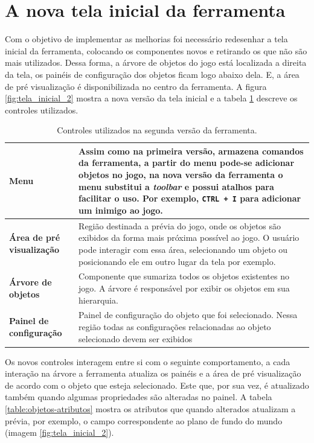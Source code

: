 \documentclass[12pt,twoside,openright,a4paper,english,brazil,sumario=tradicional]{abntex2}
\begin{document}
\section{A nova tela inicial da ferramenta}
Com o objetivo de implementar as melhorias foi necessário redesenhar a tela inicial da ferramenta, colocando os componentes novos e retirando os que não são mais utilizados. Dessa forma, a árvore de objetos do jogo está localizada a direita da tela, os painéis de configuração dos objetos ficam logo abaixo dela. E, a área de pré visualização é disponibilizada no centro da ferramenta.  A figura \ref{fig:tela_inicial_2} mostra a nova versão da tela inicial e a tabela \ref{table:ferramenta_areas_2} descreve os controles utilizados.

\begin{table}[h]
   \centering
   \begin{tabular}{| l | p{8cm} |}
      \hline
      \textbf{Menu} & Assim como na primeira versão, armazena comandos da ferramenta, a partir do menu pode-se adicionar objetos no jogo, na nova versão da ferramenta o menu substitui a \emph{toolbar} e possui atalhos para facilitar o uso. Por exemplo, \texttt{CTRL + I} para adicionar um inimigo ao jogo. \\
      \hline
      \textbf{Área de pré visualização} & Região  destinada a prévia do jogo, onde os objetos são exibidos da forma mais próxima possível ao jogo. O usuário pode interagir com essa área, selecionando um objeto ou posicionando ele em outro lugar da tela por exemplo.\\
      \hline
      \textbf{Árvore de objetos} & Componente que sumariza todos os objetos existentes no jogo. A árvore é responsável por exibir os objetos em sua hierarquia.\\
      \hline
      \textbf{Painel de configuração} & Painel de configuração do objeto que foi selecionado. Nessa região todas as configurações relacionadas ao objeto selecionado devem ser exibidos \\
      \hline
   \end{tabular}
   \caption{Controles utilizados na segunda versão da ferramenta.}
   \label{table:ferramenta_areas_2}
\end{table}

Os novos controles interagem entre si com o seguinte comportamento, a cada interação na árvore a ferramenta atualiza os painéis e a área de pré visualização de acordo com o objeto que esteja selecionado. Este que, por sua vez, é atualizado também quando algumas propriedades são alteradas no painel. A tabela \ref{table:objetos-atributos} mostra os atributos que quando alterados atualizam a prévia, por exemplo, o campo correspondente ao plano de fundo do mundo (imagem \ref{fig:tela_inicial_2}).
\end{document}
